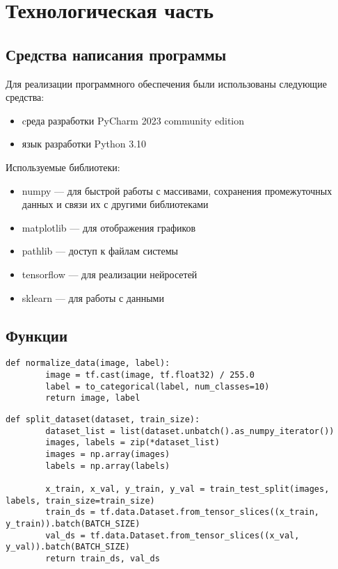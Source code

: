 \chapter{Технологическая часть}

\section{Средства написания программы}
Для реализации программного обеспечения были использованы следующие средства:

\begin{itemize}
    \item cреда разработки PyCharm 2023 community edition \cite{lib:pycharm}
    \item язык разработки Python 3.10 \cite{lib:python}
\end{itemize}
	
Используемые библиотеки:
\begin{itemize}
    \item numpy — для быстрой работы с массивами, сохранения промежуточных данных и связи их с другими библиотеками \cite{lib:numpy}
    \item matplotlib — для отображения графиков \cite{lib:matplotlib}
    \item pathlib — доступ к файлам системы \cite{lib:pathlib}
    \item tensorflow — для реализации нейросетей \cite{lib:tensorflow}
    \item sklearn — для работы с данными \cite{lib:sklearn}
\end{itemize}

\section{Функции}

\begin{lstlisting}[caption={Нормализация данных}]
    def normalize_data(image, label):
        image = tf.cast(image, tf.float32) / 255.0
        label = to_categorical(label, num_classes=10)
        return image, label
\end{lstlisting}

\begin{lstlisting}[caption={Разделение данных}]
    def split_dataset(dataset, train_size):
        dataset_list = list(dataset.unbatch().as_numpy_iterator())
        images, labels = zip(*dataset_list)
        images = np.array(images)
        labels = np.array(labels)

        x_train, x_val, y_train, y_val = train_test_split(images, labels, train_size=train_size)
        train_ds = tf.data.Dataset.from_tensor_slices((x_train, y_train)).batch(BATCH_SIZE)
        val_ds = tf.data.Dataset.from_tensor_slices((x_val, y_val)).batch(BATCH_SIZE)
        return train_ds, val_ds
\end{lstlisting}


